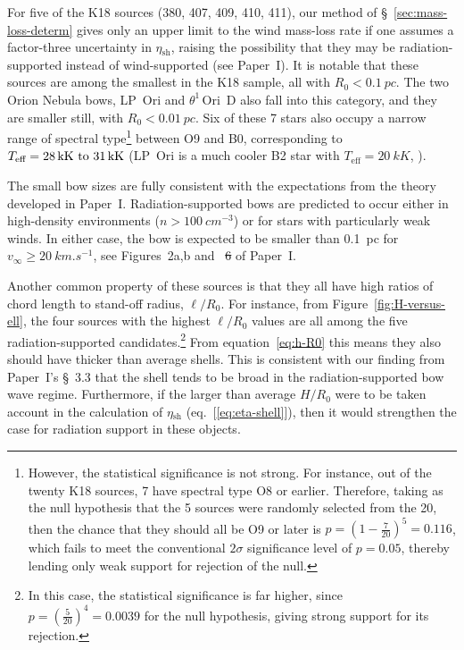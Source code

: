 \documentclass[useAMS, usenatbib, a4paper]{mnras}
\newcommand{\thD}{\(\theta^1\)\,Ori~D}
\newcommand\shell{\ensuremath{_{\text{sh}}}}
\providecommand{\DIFaddtex}[1]{{\protect\color{red!70!black}\uwave{#1}}} %
\providecommand{\DIFdeltex}[1]{{\protect\color{white!70!black} \ifmmode\scriptstyle\cancel{#1}\else\scriptsize\sout{#1}\fi}} %
\providecommand{\DIFaddbegin}{} %
\providecommand{\DIFaddend}{} %
\providecommand{\DIFdelbegin}{} %
\providecommand{\DIFdelend}{} %
\providecommand{\DIFadd}[1]{\texorpdfstring{\DIFaddtex{#1}}{#1}} %
\providecommand{\DIFdel}[1]{\texorpdfstring{\DIFdeltex{#1}}{}} %
\begin{document}
For five of the K18 sources (380, 407, 409, 410, 411), our method of
\S~\ref{sec:mass-loss-determ} gives only an upper limit to the wind
mass-loss rate if one assumes a factor-three uncertainty in
\(\eta\shell\), raising the possibility that they may be
radiation-supported instead of wind-supported (see Paper~I).  It is
notable that these sources are among the smallest in the K18 sample,
all with \(R_0 < \SI{0.1}{pc}\).  The two Orion Nebula bows, LP~Ori
and \thD{} also fall into this category, and they are smaller still,
with \(R_0 < \SI{0.01}{pc}\).  Six of these 7 stars also occupy a
narrow range of spectral type\footnote{%
  However, the statistical significance is not strong.  For
  instance, out of the twenty K18 sources, 7 have spectral type O8 or
  earlier.  Therefore, taking as the null hypothesis that the 5
  sources were randomly selected from the 20, then the chance that
  they should all be O9 or later is
  \(p = (1 - \frac{7}{20})^5 = 0.116\), which fails to meet the
  conventional \(2\sigma\) significance level of \(p = 0.05\),
  thereby lending only weak support for rejection of the null.} %
between O9 and B0, corresponding to
\(T_{\text{eff}} = \text{\SIrange{28}{31}{kK}}\) (LP~Ori is a much
cooler B2 star with \(T_{\text{eff}} = \SI{20}{kK}\),
\citealp{Petit:2008a, Alecian:2013a}).

The small bow sizes are fully consistent with the expectations from
the theory developed in Paper~I.  Radiation-supported bows are predicted
to occur either in high-density environments
(\(n > \SI{100}{cm^{-3}}\)) or for stars with particularly weak winds.
In either case, the bow is expected to be smaller than \SI{0.1}{pc}
for \(v_\infty \ge \SI{20}{km.s^{-1}}\), see Figures~2a,b and~\DIFdelbegin \DIFdel{6 }\DIFdelend \DIFaddbegin \DIFadd{8 }\DIFaddend of
Paper~I.\@

Another common property of these sources is that they all have high
ratios of chord length to stand-off radius, \(\ell/R_0\).  For
instance, from Figure~\ref{fig:H-versus-ell}, the four sources with
the highest \(\ell/R_0\) values are all among the five
radiation-supported candidates.\footnote{%
  In this case, the statistical significance is far higher, since
  \(p = (\frac{5}{20})^4 = 0.0039\) for the null hypothesis, giving
  strong support for its rejection.}  From equation~\eqref{eq:h-R0}
this means they also should have thicker than average shells.  This is
consistent with our finding from Paper~I's \S~3.3 that the shell tends
to be broad in the radiation-supported bow wave regime.  Furthermore,
if the larger than average \(H/R_0\) were to be taken account in the
calculation of \(\eta\shell\) (eq.~[\ref{eq:eta-shell}]), then it
would strengthen the case for radiation support in these objects.
\end{document}
